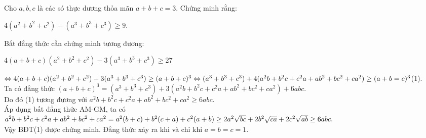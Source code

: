 \begin{ex}%
Cho $a,b,c$ là các só thực dương thỏa mãn $a+b+c=3$. Chứng minh rằng:
\begin{center}
	$4(a^2+b^2+c^2)-(a^3+b^3+c^3)\geq 9$.
\end{center}
\loigiai
   {Bất đẳng thức cần chứng minh tương đương:
   	\begin{center}
   		$4(a+b+c)(a^2+b^2+c^2)-3(a^3+b^3+c^3)\geq 27$
   	\end{center}
   $\Leftrightarrow 4(a+b+c)(a^2+b^2+c^2)-3(a^3+b^3+c^3)\geq (a+b+c)^3\\\Leftrightarrow (a^3+b^3+c^3)+4(a^2b+b^2c+c^2a+ab^2+bc^2+ca^2)\geq (a+b=c)^3 $(1).\\
 Ta có đẳng thức $(a+b+c)^3=(a^3+b^3+c^3)+3(a^2b+b^2c+c^2a+ab^2+bc^2+ca^2)+6abc$.\\
 Do đó (1) tương đương với $a^2b+b^2c+c^2a+ab^2+bc^2+ca^2\geq 6abc$.\\
   Áp dụng bất đẳng thức AM-GM, ta có\\
   $a^2b+b^2c+c^2a+ab^2+bc^2+ca^2=a^2(b+c)+b^2(c+a)+c^2(a+b)\\\geq 2a^2\sqrt{bc}+2b^2\sqrt{ca}+2c^2\sqrt{ab}\geq 6abc.$\\
   Vậy BĐT(1) được chứng minh. Đẳng thức xảy ra khi và chỉ khi $a=b=c=1$.
} 
\end{ex}
